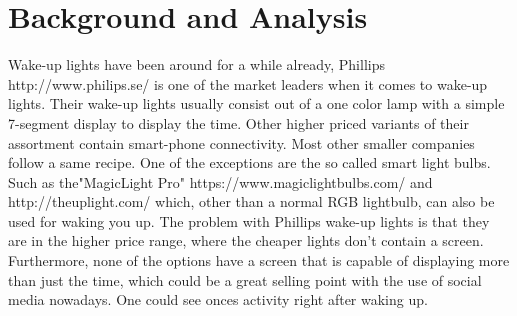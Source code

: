 \chapter{Background and Analysis}
Wake-up lights have been around for a while already, Phillips http://www.philips.se/ is one of the market leaders when it comes to wake-up lights. Their wake-up lights usually consist out of a one color lamp with a simple 7-segment display to display the time. Other higher priced variants of their assortment contain smart-phone connectivity. Most other smaller companies follow a same recipe. One of the exceptions are the so called smart light bulbs. Such as the"MagicLight Pro" https://www.magiclightbulbs.com/ and http://theuplight.com/ which, other than a normal RGB lightbulb, can also be used for waking you up. The problem with Phillips wake-up lights is that they are in the higher price range, where the cheaper lights don't contain a screen. Furthermore, none of the options have a screen that is capable of displaying more than just the time, which could be a great selling point with the use of social media nowadays. One could see onces activity right after waking up.